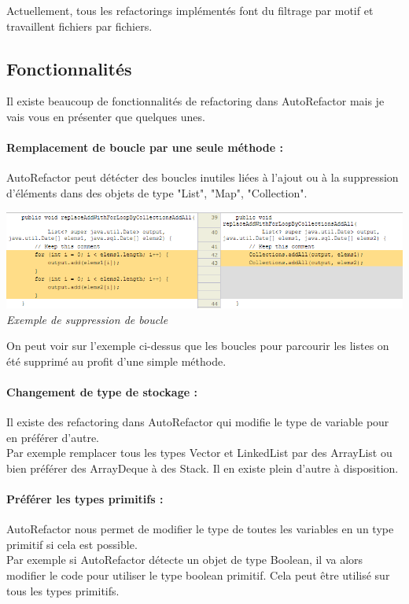 \documentclass[a4paper,twoside,12pt,openright]{report}
\begin{document}
Actuellement, tous les refactorings implémentés font du filtrage par motif et travaillent fichiers par fichiers.\\

\subsection{Fonctionnalités}
Il existe beaucoup de fonctionnalités de refactoring dans AutoRefactor mais je vais vous en présenter que quelques unes.\\

\paragraph{Remplacement de boucle par une seule méthode :}
AutoRefactor peut détécter des boucles inutiles liées à l'ajout ou à la suppression d'éléments dans des objets de type "List", "Map", "Collection".\\

\begin{center}
\includegraphics[scale=0.7]{Image/SupBoucle.png}\\
\itshape{Exemple de suppression de boucle \cite{ref10}}
\end{center}


On peut voir sur l'exemple ci-dessus que les boucles pour parcourir les listes on été supprimé au profit d'une simple méthode.\\

\paragraph{Changement de type de stockage :}
Il existe des refactoring dans AutoRefactor qui modifie le type de variable pour en préférer d'autre.\\
Par exemple remplacer tous les types Vector et LinkedList par des ArrayList ou bien préférer des ArrayDeque à des Stack. Il en existe plein d'autre à disposition.\\

\paragraph{Préférer les types primitifs :}
AutoRefactor nous permet de modifier le type de toutes les variables en un type primitif si cela est possible.\\
Par exemple si AutoRefactor détecte un objet de type Boolean, il va alors modifier le code pour utiliser le type boolean primitif. Cela peut être utilisé sur tous les types primitifs.\\
\end{document}
